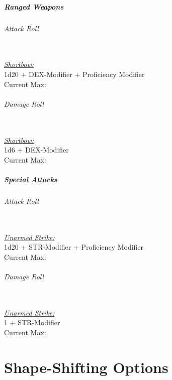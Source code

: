 \documentclass[letterpaper,openany,oneside,twocolumn]{book}
\begin{document}
\subsubsection*{Ranged Weapons}
\paragraph*{Attack Roll}\hfill\\
\underline{\textit{Shortbow:}}\\
1d20 + DEX-Modifier + Proficiency Modifier\\
\indent Current Max: 
\paragraph*{Damage Roll}\hfill\\
\underline{\textit{Shortbow:}}\\
1d6 + DEX-Modifier\\
\indent Current Max: 
\subsubsection*{Special Attacks}
\paragraph*{Attack Roll}\hfill\\
\underline{\textit{Unarmed Strike:}}\\
1d20 + STR-Modifier + Proficiency Modifier\\
\indent Current Max: 
\paragraph*{Damage Roll}\hfill\\
\underline{\textit{Unarmed Strike:}}\\
1 + STR-Modifier\\
\indent Current Max: 

\part*{Shape-Shifting Options}
\end{document}
